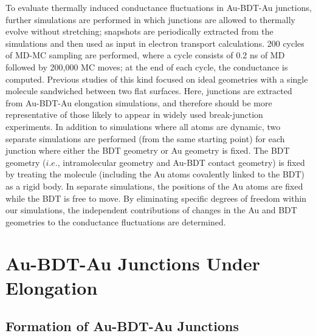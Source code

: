 \documentclass[10pt]{report}  %
\begin{document}
To evaluate thermally induced conductance fluctuations in Au-BDT-Au junctions, further simulations are performed in which junctions are allowed to thermally evolve without stretching; snapshots are periodically extracted from the simulations and then used as input in electron transport calculations. 200 cycles of MD-MC sampling are performed, where a cycle consists of 0.2 ns of MD followed by 200,000 MC moves; at the end of each cycle, the conductance is computed. Previous studies \cite{Andrews:2008,Kim:2010} of this kind focused on ideal geometries with a single molecule sandwiched between two flat surfaces. Here, junctions are extracted from Au-BDT-Au elongation simulations, and therefore should be more representative of those likely to appear in widely used break-junction experiments. \cite{Ulrich:2006,Malen:2009,Venkataraman-nature:2006,Kiguchi:2012,Kim:2011,Tsutsui:2006,Tsutsui:2009,Frei:2012,Arroyo:2011,Huang:2007,Bruot:2012,Xiao:2004} In addition to simulations where all atoms are dynamic, two separate simulations are performed (from the same starting point) for each junction where either the BDT geometry or Au geometry is fixed. The BDT geometry ($i.e.$, intramolecular geometry and Au-BDT contact geometry) is fixed by treating the molecule (including the Au atoms covalently linked to the BDT) as a rigid body. In separate simulations, the positions of the Au atoms are fixed while the BDT is free to move. By eliminating specific degrees of freedom within our simulations, the independent contributions of changes in the Au and BDT geometries to the conductance fluctuations are determined.


\section{Au-BDT-Au Junctions Under Elongation}

\subsection{Formation of Au-BDT-Au Junctions}
\end{document}
